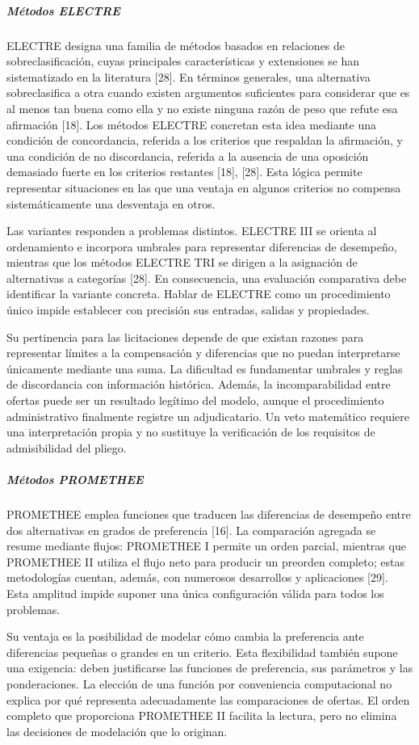\documentclass[12pt,a4paper]{article}
\begin{document}
\subparagraph{Métodos ELECTRE}

ELECTRE designa una familia de métodos basados en relaciones de sobreclasificación, cuyas principales características y extensiones se han sistematizado en la literatura [28]. En términos generales, una alternativa sobreclasifica a otra cuando existen argumentos suficientes para considerar que es al menos tan buena como ella y no existe ninguna razón de peso que refute esa afirmación [18]. Los métodos ELECTRE concretan esta idea mediante una condición de concordancia, referida a los criterios que respaldan la afirmación, y una condición de no discordancia, referida a la ausencia de una oposición demasiado fuerte en los criterios restantes [18], [28]. Esta lógica permite representar situaciones en las que una ventaja en algunos criterios no compensa sistemáticamente una desventaja en otros.

Las variantes responden a problemas distintos. ELECTRE III se orienta al ordenamiento e incorpora umbrales para representar diferencias de desempeño, mientras que los métodos ELECTRE TRI se dirigen a la asignación de alternativas a categorías [28]. En consecuencia, una evaluación comparativa debe identificar la variante concreta. Hablar de ELECTRE como un procedimiento único impide establecer con precisión sus entradas, salidas y propiedades.

Su pertinencia para las licitaciones depende de que existan razones para representar límites a la compensación y diferencias que no puedan interpretarse únicamente mediante una suma. La dificultad es fundamentar umbrales y reglas de discordancia con información histórica. Además, la incomparabilidad entre ofertas puede ser un resultado legítimo del modelo, aunque el procedimiento administrativo finalmente registre un adjudicatario. Un veto matemático requiere una interpretación propia y no sustituye la verificación de los requisitos de admisibilidad del pliego.

\subparagraph{Métodos PROMETHEE}

PROMETHEE emplea funciones que traducen las diferencias de desempeño entre dos alternativas en grados de preferencia [16]. La comparación agregada se resume mediante flujos: PROMETHEE I permite un orden parcial, mientras que PROMETHEE II utiliza el flujo neto para producir un preorden completo; estas metodologías cuentan, además, con numerosos desarrollos y aplicaciones [29]. Esta amplitud impide suponer una única configuración válida para todos los problemas.

Su ventaja es la posibilidad de modelar cómo cambia la preferencia ante diferencias pequeñas o grandes en un criterio. Esta flexibilidad también supone una exigencia: deben justificarse las funciones de preferencia, sus parámetros y las ponderaciones. La elección de una función por conveniencia computacional no explica por qué representa adecuadamente las comparaciones de ofertas. El orden completo que proporciona PROMETHEE II facilita la lectura, pero no elimina las decisiones de modelación que lo originan.
\end{document}
